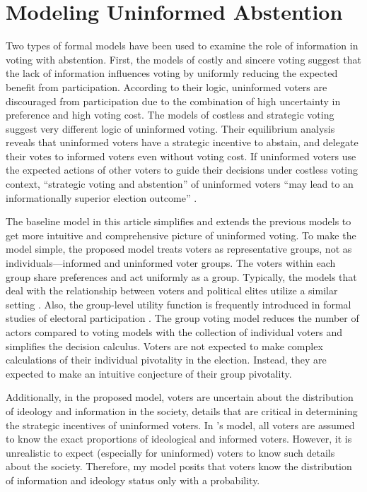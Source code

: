 \documentclass[letterpaper, 12pt]{article}
\begin{document}
    \section*{Modeling Uninformed Abstention}
    
    \par Two types of formal models have been used to examine the role of information in voting with abstention. First, the models of costly and sincere voting \citep{Downs1957anec, Riker1968thof, Matsusaka1995exvo} suggest that the lack of information influences voting by uniformly reducing the expected benefit from participation. According to their logic, uninformed voters are discouraged from participation due to the combination of high uncertainty in preference and high voting cost. The models of costless and strategic voting \citep{Feddersen1996thsw, Feddersen1999abin} suggest very different logic of uninformed voting. Their equilibrium analysis reveals that uninformed voters have a strategic incentive to abstain, and delegate their votes to informed voters even without voting cost. If uninformed voters use the expected actions of other voters to guide their decisions under costless voting context, ``strategic voting and abstention'' of uninformed voters ``may lead to an informationally superior election outcome'' \citep[][418]{Feddersen1996thsw}.  
    
    \par The baseline model in this article simplifies and extends the previous models to get more intuitive and comprehensive picture of uninformed voting. To make the model simple, the proposed model treats voters as representative groups, not as individuals---informed and uninformed voter groups. The voters within each group share preferences and act uniformly as a group. Typically, the models that deal with the relationship between voters and political elites utilize a similar setting \citep[e.g.,][]{Little2015pran}. Also, the group-level utility function is frequently introduced in formal studies of electoral participation \citep{Morton1991grin, Schram1991whpe, Uhlaner1989ratu, Coate2004grru,Feddersen2006thof}. The group voting model reduces the number of actors compared to voting models with the collection of individual voters and simplifies the decision calculus. Voters are not expected to make complex calculations of their individual pivotality in the election. Instead, they are expected to make an intuitive conjecture of their group pivotality.
    
    \par Additionally, in the proposed model, voters are uncertain about the distribution of ideology and information in the society, details that are critical in determining the strategic incentives of uninformed voters. In \citeauthor{Feddersen1996thsw}'s model, all voters are assumed to know the exact proportions of ideological and informed voters. However, it is unrealistic to expect (especially for uninformed) voters to know such details about the society. Therefore, my model posits that voters know the distribution of information and ideology status only with a probability.
    
\end{document}
